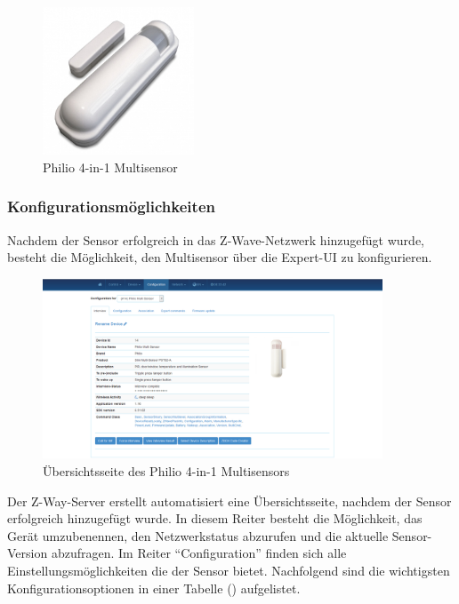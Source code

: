 \begin{figure}[h!]
	\centering
	\includegraphics[width=0.4\textwidth]{img/Sensorevaluation/Philio.jpeg}
	\caption{Philio 4-in-1 Multisensor}
	\label{fig:sensorenPhilioMultisensor}
\end{figure}

\subsubsection{Konfigurationsmöglichkeiten}
Nachdem der Sensor erfolgreich in das Z-Wave-Netzwerk hinzugefügt wurde, besteht die Möglichkeit, den Multisensor über die Expert-UI zu konfigurieren.

\begin{figure}[h!]
	\centering
	\includegraphics[width=0.9\textwidth]{img/Sensorevaluation/PhilioConf1.png}
	\caption{Übersichtsseite des Philio 4-in-1 Multisensors}
	\label{fig:sensorenPhilioConf1}
\end{figure}

Der Z-Way-Server erstellt automatisiert eine Übersichtsseite, nachdem der Sensor erfolgreich hinzugefügt wurde. In diesem Reiter besteht die Möglichkeit, das Gerät umzubenennen, den Netzwerkstatus abzurufen und die aktuelle Sensor-Version abzufragen. Im Reiter "`Configuration"' finden sich alle Einstellungsmöglichkeiten die der Sensor bietet. Nachfolgend sind die wichtigsten Konfigurationsoptionen in einer Tabelle () aufgelistet.


